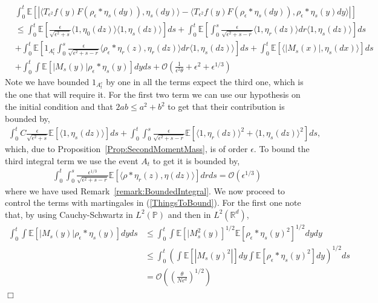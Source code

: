\documentclass[12pt]{article}
\newenvironment {proof}{{\noindent\bf Proof }}{\hfill $\Box$ \medskip}
\newcommand{\IE}{\mathbb E}
\newcommand{\IR}{\mathbb R}
\begin{document}
\begin{proof}
\begin{align}
&\int_0^t \IE[|\langle T_{\epsilon^2} f(y) F(\rho_\epsilon *\eta_s(dy)), \eta_s(dy) \rangle - \langle T_{\epsilon^2} f(y) F(\rho_\epsilon * \eta_s(dy)), \rho_\epsilon * \eta_s(y) dy \rangle|] \nonumber \\ &\leq   \int_0^t \IE[ \frac{\epsilon}{\sqrt{\epsilon^2 + s}} \langle 1,\eta_0(dz) \rangle \langle 1, \eta_s(dz)\rangle ] ds +  \int_0^t \IE[  \int_0^s \frac{\epsilon}{\sqrt{\epsilon^2 + s - r}} \langle 1, \eta_r (dz) \rangle dr \langle 1, \eta_s(dz) \rangle  ] ds \nonumber\\ & + \int_0^t \IE[   1_{A^c_{t}} \int_0^s \frac{\epsilon}{\sqrt{\epsilon^2 + s - r}} \langle \rho_\epsilon*\eta_r(z), \eta_r(dz) \rangle dr \langle 1, \eta_s(dz) \rangle  ] ds + \int_0^t \IE[\langle |M_s(x)|,\eta_s(dx) \rangle] ds \nonumber \\ &+ \int_0^t \int \IE[|M_s(y)|\rho_\epsilon*\eta_s(y)] dy ds  +\mathcal{O}\left( \frac{1}{\epsilon^2 \theta} + \epsilon^2 + \epsilon^{1/3} \right)  \label{ThingsToBound}
\end{align}
Note we have bounded $1_{A^c_{t}}$ by one in all the terms expect the third one, which is the one that will require it. For the first two term we can use our hypothesis on the initial condition and that $2 ab \leq a^2+b^2$ to get that their contribution is bounded by,
\begin{align*}
\int_0^t C \frac{\epsilon}{\sqrt{\epsilon^2+s}}\IE[\langle 1, \eta_s(dz) \rangle] ds + \int_0^t \int_0^s \frac{\epsilon}{\sqrt{\epsilon^2+s-r}}\IE[\langle 1, \eta_r(dz)\rangle^2 + \langle 1, \eta_s(dz)\rangle^2] ds,
\end{align*}
which, due to Proposition~\ref{Prop:SecondMomentMass}, is of order $\epsilon$. To bound the third integral term we use the event $A_{t}$ to get it is bounded by,
\begin{align*}
\int_0^t \int_0^s \frac{\epsilon^{1/3}}{\sqrt{\epsilon^2+s-r}} \IE[ \langle \rho*\eta_r(z), \eta(dz) \rangle] dr ds = \mathcal{O}(\epsilon^{1/3})
\end{align*}
where we have used Remark~\ref{remark:BoundedIntegral}. 
We now proceed to control the terms with martingales in (\ref{ThingsToBound}). For the first one note that, by using Cauchy-Schwartz in $L^2(\mathbb{P})$ and then in $L^2(\IR^d)$,
\begin{align}
\int_0^t \int \IE[|M_s(y)|\rho_\epsilon*\eta_s(y)] dy ds & \leq \int_0^t \int \IE[|M^2_s(y)]^{1/2} \IE[\rho_\epsilon * \eta_s(y)^2]^{1/2} dy dy \nonumber \\ & \leq \int_0^t \left( \int \IE[|M_s(y)^2|] dy \int \IE[\rho_\epsilon * \eta_s(y)^2] dy \right)^{1/2} ds  \nonumber \\ &= \mathcal{O}\left( \left( \frac{\theta}{N \epsilon^d} \right)^{1/2} \right)

\end{align}
\end{proof}
\end{document}
